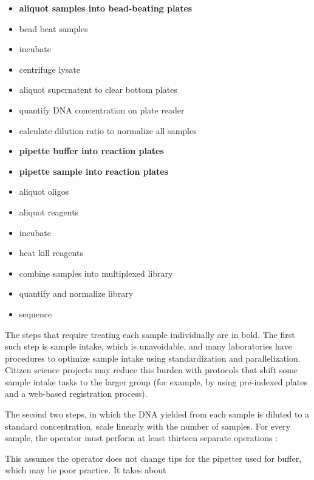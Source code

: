 \begin{refsection}
\begin{itemize}[noitemsep]
\item \textbf{aliquot samples into bead-beating plates}
\item bead beat samples
\item incubate
\item centrifuge lysate
\item aliquot supernatent to clear bottom plates
\item quantify DNA concentration on plate reader
\item calculate dilution ratio to normalize all samples
\item \textbf{pipette buffer into reaction plates}
\item \textbf{pipette sample into reaction plates}
\item aliquot oligos
\item aliquot reagents
\item incubate
\item heat kill reagents
\item combine samples into multiplexed library
\item quantify and normalize library
\item sequence
\end{itemize}

\noindent The steps that require treating each sample individually are in bold. The first such step is sample intake, which is unavoidable, and many laboratories have procedures to optimize sample intake using standardization and parallelization. Citizen science projects may reduce this burden with protocols that shift some sample intake tasks to the larger group (for example, by using pre-indexed plates and a web-based registration process). 

The second two steps, in which the DNA yielded from each sample is diluted to a standard concentration, scale linearly with the number of samples. For every sample, the operator must perform at least thirteen separate operations :



\noindent This assumes the operator does not change tips for the pipetter used for buffer, which may be poor practice. It takes about 


\printbibliography[heading=subbibliography]

\end{refsection}